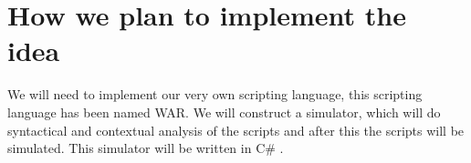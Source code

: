 \section*{How we plan to implement the idea}
	We will need to implement our very own scripting language, this scripting language has been named WAR.
	We will construct a simulator, which will do syntactical and contextual analysis of the scripts and 
	after this the scripts will be simulated. This simulator will be written in C\# .

	
	

